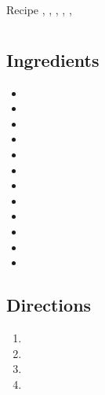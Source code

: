 Recipe
  , 
  , 
  , 
  , 
  , 

\section{ }

\subsection{ Ingredients }

\begin{itemize}
  \item 
  \item 
  \item 
  \item 
  \item 
  \item 
  \item 
  \item 
  \item 
  \item 
  \item 
  \item 
\end{itemize}

\subsection{ Directions }

\begin{enumerate}
  \item 
  \item 
  \item 
  \item 
\end{enumerate}

